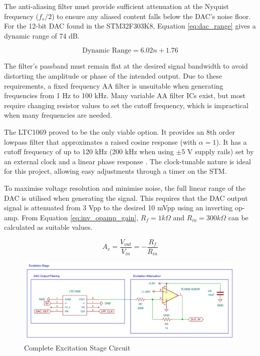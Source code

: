 The anti-aliasing filter must provide sufficient attenuation at the Nyquist frequency ($f_s/2$) to ensure any aliased content falls below the \ac{DAC}'s noise floor. For the 12-bit \ac{DAC} found in the STM32F303K8, Equation \ref{eq:dac_range} gives a dynamic range of 74 dB. 

\begin{equation}
    \text{Dynamic Range} = 6.02n + 1.76 
    \label{eq:dac_range}
\end{equation}

The filter's passband must remain flat at the desired signal bandwidth to avoid distorting the amplitude or phase of the intended output. Due to these requirements, a fixed frequency AA filter is unsuitable when generating frequencies from 1 Hz to 100 kHz. Many variable AA filter ICs exist, but most require changing resistor values to set the cutoff frequency, which is impractical when many frequencies are needed. 

The LTC1069 proved to be the only viable option. It provides an 8th order lowpass filter that approximates a raised cosine response (with $\alpha=1$). It has a cutoff frequency of up to 120 kHz (200 kHz when using $\pm5$ V supply rails) set by an external clock and a linear phase response \cite{LTC10697CS8PBF}. The clock-tunable nature is ideal for this project, allowing easy adjustments through a timer on the STM.

To maximise voltage resolution and minimise noise, the full linear range of the \ac{DAC} is utilised when generating the signal. This requires that the \ac{DAC} output signal is attenuated from 3 Vpp to the desired 10 mVpp using an inverting op-amp. From Equation \ref{eq:inv_opamp_gain}, $R_{f}=1 k\Omega$ and $R_{in}=300 k\Omega$ can be calculated as suitable values.

\begin{equation}
    A_v = \frac{V_{out}}{V_{in}} = -\frac{R_f}{R_{in}}
    \label{eq:inv_opamp_gain}
\end{equation}

\begin{figure}[]
    \centering
    \includegraphics[width=\textwidth]{ExcitationSchem.png}
    \caption{Complete Excitation Stage Circuit}
    \label{fig:excitation_stage_circuit}
\end{figure}

